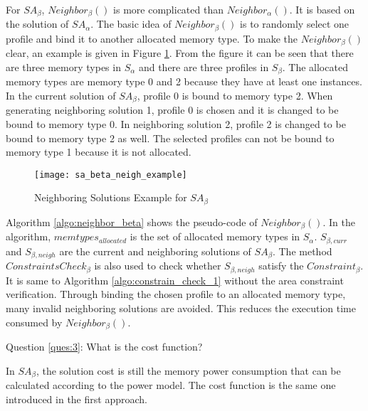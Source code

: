 		For $SA_{\beta}$, $Neighbor_{\beta}()$ is more complicated than
		$Neighbor_{\alpha}()$. It is based on the solution of $SA_{\alpha}$.
		The basic idea of $Neighbor_{\beta}()$ is to randomly select one profile
		and bind it to another allocated memory type.
		To make the $Neighbor_{\beta}()$ clear, an example is given in
		Figure \ref{fig:sa_beta_neigh_example}.
		From the figure it can be seen that there are three
		memory types in $S_{\alpha}$ and there are three profiles in $S_{\beta}$.
		The allocated memory types are memory type 0 and 2 because they have at least one instances.
		In the current solution of $SA_{\beta}$, profile 0 is bound to
		memory type 2.
		When generating neighboring solution 1, profile 0 is chosen and it is changed to
		be bound to memory type 0.
		In neighboring solution 2, profile 2 is changed to be bound to memory type 2
		as well.
		The selected profiles can not be bound to memory type 1 because it is not allocated.
		\begin{figure}[h]
			\begin{center}
				\texttt{[image: sa\_beta\_neigh\_example]}
				\caption{Neighboring Solutions Example for $SA_{\beta}$}
				\label{fig:sa_beta_neigh_example}
			\end{center}
		\end{figure}		
	
		Algorithm \ref{algo:neighbor_beta} shows the pseudo-code of
		$Neighbor_{\beta}()$.
		In the algorithm, $memtypes_{allocated}$ is the set of allocated
		memory types in $S_{\alpha}$.
		$S_{\beta,curr}$ and $S_{\beta,neigh}$ are the current and 
		neighboring solutions of $SA_{\beta}$.
		The method $ConstraintsCheck_{\beta}$ is also used to check whether
		$S_{\beta,neigh}$ satisfy the $Constraint_{\beta}$. It is same to
		Algorithm
		\ref{algo:constrain_check_1} without the area constraint verification.
		Through binding the chosen profile to an allocated memory type,
		many invalid neighboring solutions are avoided. This reduces the
		execution time consumed by $Neighbor_{\beta}()$.		
		
	
		Question \ref{ques:3}: What is the cost function?
	
		In $SA_{\beta}$, the solution cost is still the memory power consumption
		that can be calculated according to the power model. The cost function is
		the same one introduced in the first approach.
		
